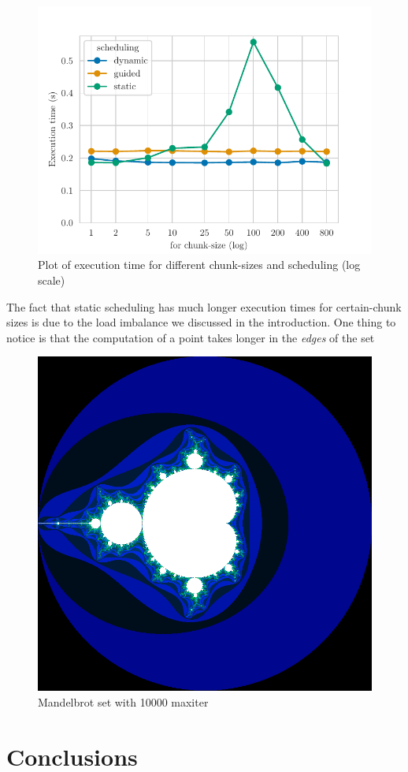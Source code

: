 \begin{figure}[H]
    \centering
    \includegraphics{plots/for-scheduling_log.pdf}
    \caption{Plot of execution time for different chunk-sizes and scheduling (log scale)}
    \label{fig:for_log} 
\end{figure}

The fact that static scheduling has much longer execution times for certain-chunk sizes is due to the load imbalance
we discussed in the introduction. One thing to notice is that the computation of a point takes longer in the \emph{edges}
of the set

\begin{figure}[H]
    \centering
    \includegraphics{images/set.png}
    \caption{Mandelbrot set with 10000 maxiter}
    \label{fig:set} 
\end{figure}

\section{Conclusions}%
\label{sec:Conclusions}




